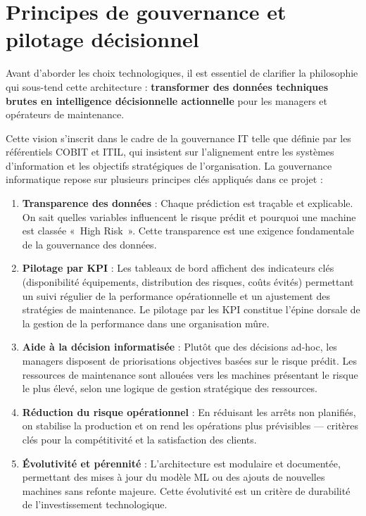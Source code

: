 \documentclass[a4paper,12pt]{report}
\begin{document}
\section{Principes de gouvernance et pilotage décisionnel}

Avant d'aborder les choix technologiques, il est essentiel de clarifier la philosophie qui sous-tend cette architecture : \textbf{transformer des données techniques brutes en intelligence décisionnelle actionnelle} pour les managers et opérateurs de maintenance.

Cette vision s'inscrit dans le cadre de la gouvernance IT telle que définie par les référentiels COBIT et ITIL, qui insistent sur l'alignement entre les systèmes d'information et les objectifs stratégiques de l'organisation. La gouvernance informatique repose sur plusieurs principes clés appliqués dans ce projet :

\begin{enumerate}
    \item \textbf{Transparence des données} : Chaque prédiction est traçable et explicable. On sait quelles variables influencent le risque prédit et pourquoi une machine est classée «~High Risk~». Cette transparence est une exigence fondamentale de la gouvernance des données.
    
    \item \textbf{Pilotage par KPI} : Les tableaux de bord affichent des indicateurs clés (disponibilité équipements, distribution des risques, coûts évités) permettant un suivi régulier de la performance opérationnelle et un ajustement des stratégies de maintenance. Le pilotage par les KPI constitue l'épine dorsale de la gestion de la performance dans une organisation mûre.
    
    \item \textbf{Aide à la décision informatisée} : Plutôt que des décisions ad-hoc, les managers disposent de priorisations objectives basées sur le risque prédit. Les ressources de maintenance sont allouées vers les machines présentant le risque le plus élevé, selon une logique de gestion stratégique des ressources.
    
    \item \textbf{Réduction du risque opérationnel} : En réduisant les arrêts non planifiés, on stabilise la production et on rend les opérations plus prévisibles — critères clés pour la compétitivité et la satisfaction des clients.
    
    \item \textbf{Évolutivité et pérennité} : L'architecture est modulaire et documentée, permettant des mises à jour du modèle ML ou des ajouts de nouvelles machines sans refonte majeure. Cette évolutivité est un critère de durabilité de l'investissement technologique.
\end{enumerate}
\end{document}
